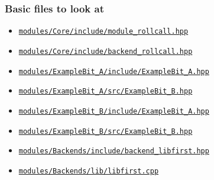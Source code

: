 \documentclass[xcolor=dvipsnames]{beamer}
\begin{document}
\begin{frame}
\frametitle{Basic files to look at}

\small
\begin{itemize}
\item \href{run:/home/pat/gambit-hepforge/modules/Core/include/module_rollcall.hpp}{\textcolor{darkMahogany}{\texttt{modules/Core/include/module\_rollcall.hpp}}}
\item \href{run:/home/pat/gambit-hepforge/modules/Core/include/backend_rollcall.hpp}{\textcolor{darkMahogany}{\texttt{modules/Core/include/backend\_rollcall.hpp}}}
\item \href{run:/home/pat/gambit-hepforge/modules/ExampleBit_A/include/ExampleBit_A.hpp}{\textcolor{darkMahogany}{\texttt{modules/ExampleBit\_A/include/ExampleBit\_A.hpp}}}
\item \href{run:/home/pat/gambit-hepforge/modules/ExampleBit_A/src/ExampleBit_B.hpp}{\textcolor{darkMahogany}{\texttt{modules/ExampleBit\_A/src/ExampleBit\_B.hpp}}}
\item \href{run:/home/pat/gambit-hepforge/modules/ExampleBit_B/include/ExampleBit_A.hpp}{\textcolor{darkMahogany}{\texttt{modules/ExampleBit\_B/include/ExampleBit\_A.hpp}}}
\item \href{run:/home/pat/gambit-hepforge/modules/ExampleBit_B/src/ExampleBit_B.hpp}{\textcolor{darkMahogany}{\texttt{modules/ExampleBit\_B/src/ExampleBit\_B.hpp}}}
\item \href{run:/home/pat/gambit-hepforge/modules/Backends/include/backend_libfirst.hpp}{\textcolor{darkMahogany}{\texttt{modules/Backends/include/backend\_libfirst.hpp}}}
\item \href{run:/home/pat/gambit-hepforge/modules/Backends/lib/libfirst.cpp}{\textcolor{darkMahogany}{\texttt{modules/Backends/lib/libfirst.cpp}}}
\end{itemize}



\end{frame}
\end{document}
